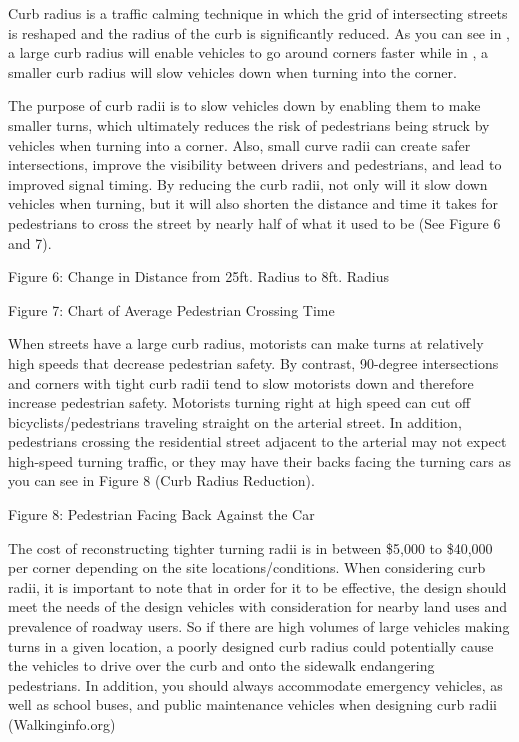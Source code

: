 Curb radius is a traffic calming technique in which the grid of intersecting streets is reshaped and the radius of the curb is significantly reduced. As you can see in , a large curb radius will enable vehicles to go around corners faster while in , a smaller curb radius will slow vehicles down when turning into the corner.

\begin{figure}
\centering

\end{figure}

        The purpose of curb radii is to slow vehicles down by enabling them to make smaller turns, which ultimately reduces the risk of pedestrians being struck by vehicles when turning into a corner. Also, small curve radii can create safer intersections, improve the visibility between drivers and pedestrians, and lead to improved signal timing. By reducing the curb radii, not only will it slow down vehicles when turning, but it will also shorten the distance and time it takes for pedestrians to cross the street by nearly half of what it used to be (See Figure 6 and 7).

Figure 6: Change in Distance from 25ft. Radius to 8ft. Radius

Figure 7: Chart of Average Pedestrian Crossing Time

        When streets have a large curb radius, motorists can make turns at relatively high speeds that decrease pedestrian safety. By contrast, 90-degree intersections and corners with tight curb radii tend to slow motorists down and therefore increase pedestrian safety. Motorists turning right at high speed can cut off bicyclists/pedestrians traveling straight on the arterial street. In addition, pedestrians crossing the residential street adjacent to the arterial may not expect high-speed turning traffic, or they may have their backs facing the turning cars as you can see in Figure 8 (Curb Radius Reduction).

Figure 8: Pedestrian Facing Back Against the Car

The cost of reconstructing tighter turning radii is in between \$5,000 to \$40,000 per corner depending on the site locations/conditions. When considering curb radii, it is important to note that in order for it to be effective, the design should meet the needs of the design vehicles with consideration for nearby land uses and prevalence of roadway users. So if there are high volumes of large vehicles making turns in a given location, a poorly designed curb radius could potentially cause the vehicles to drive over the curb and onto the sidewalk endangering pedestrians. In addition, you should always accommodate emergency vehicles, as well as school buses, and public maintenance vehicles when designing curb radii (Walkinginfo.org)


